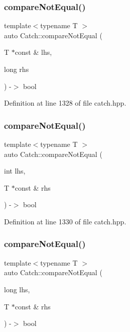 \subsubsection{\texorpdfstring{compare\+Not\+Equal()}{compareNotEqual()}\hspace{0.1cm}{\footnotesize\ttfamily [3/5]}}
{\footnotesize\ttfamily template$<$typename T $>$ \\
auto Catch\+::compare\+Not\+Equal (\begin{DoxyParamCaption}\item[{T $\ast$const \&}]{lhs,  }\item[{long}]{rhs }\end{DoxyParamCaption}) -\/$>$ bool }



Definition at line 1328 of file catch.\+hpp.

\mbox{\label{namespace_catch_adb4b3e912b89a987025ca28cf0c92ba8}} 
\subsubsection{\texorpdfstring{compare\+Not\+Equal()}{compareNotEqual()}\hspace{0.1cm}{\footnotesize\ttfamily [4/5]}}
{\footnotesize\ttfamily template$<$typename T $>$ \\
auto Catch\+::compare\+Not\+Equal (\begin{DoxyParamCaption}\item[{int}]{lhs,  }\item[{T $\ast$const \&}]{rhs }\end{DoxyParamCaption}) -\/$>$ bool }



Definition at line 1330 of file catch.\+hpp.

\mbox{\label{namespace_catch_a3db634a0adf44a1148767ba149ccf34d}} 
\subsubsection{\texorpdfstring{compare\+Not\+Equal()}{compareNotEqual()}\hspace{0.1cm}{\footnotesize\ttfamily [5/5]}}
{\footnotesize\ttfamily template$<$typename T $>$ \\
auto Catch\+::compare\+Not\+Equal (\begin{DoxyParamCaption}\item[{long}]{lhs,  }\item[{T $\ast$const \&}]{rhs }\end{DoxyParamCaption}) -\/$>$ bool }




